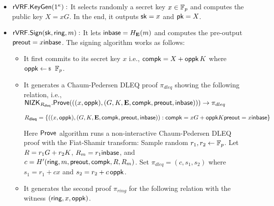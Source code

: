 \begin{itemize}
	\item $ {\mathsf{rVRF}}.{\mathsf{KeyGen}}(1^\kappa):  $ It selects randomly a secret key $ x \in \mathbb{F}_p$ and computes the public key $ X = xG $. In the end, it outputs $ \mathsf{sk} = x $ and $ \mathsf{pk} = X $.
	
	
	
	
	\item $ {\mathsf{rVRF}}.{\mathsf{Sign}}(\mathsf{sk}, \mathsf{ring}, m):$ It lets $ {\mathsf{inbase}} = H_{\mathbf{E}}(m) $ and computes the pre-output $ {\mathsf{preout}}= x{\mathsf{inbase}}$. The signing algorithm works as follows: 

	\begin{itemize}
		
		\item It first commits to its secret key $
		x$ i.e., $ \mathsf{compk} = X + \mathsf{oppk} \, K $ where $ \openpk \leftsample \FF_p $.
		\item It generates a Chaum-Pedersen DLEQ proof $ \pi_{dleq} $ showing the following relation, i.e., $ {\mathsf{NIZK}}_{R_{\mathsf{dleq}}}.{\mathsf{Prove}}(((x, \mathsf{oppk}), (G, K,{\mathbf{E}},\mathsf{compk},{\mathsf{preout}},{\mathsf{inbase}}))) \rightarrow \pi_{dleq}$
		
		\begin{equation}
			R_{\mathsf{dleq}}= \{((x, \mathsf{oppk}), (G, K,{\mathbf{E}},\mathsf{compk},{\mathsf{preout}},{\mathsf{inbase}})): \mathsf{compk} = xG + \mathsf{oppk} K {\mathsf{preout}} = x{\mathsf{inbase}} \} \label{rel:commit}
		\end{equation}		
		
		Here $ {\mathsf{Prove}} $ algorithm runs a non-interactive Chaum-Pedersen DLEQ proof with the Fiat-Shamir transform:  Sample random $r_1, r_2 \leftarrow \mathbb{F}_p$.
		Let $R = r_1 G + r_2 K$, $R_m = r_1 {\mathsf{inbase}}$, and
		$c = H'(\mathsf{ring}, m, {\mathsf{preout}},\mathsf{compk},R,R_m)$.
		Set $\pi_{dleq} = (c,s_1,s_2)$ where $s_1 = r_1 + c x$ and $s_2= r_2 + c \, \mathsf{oppk}$.
		\item %
		It generates the second proof $ \pi_{ring} $ for the following relation with  the witness $ (\mathsf{ring}, x, \mathsf{oppk}) $. 		
		

\end{itemize}
\end{itemize}
